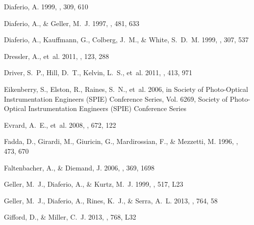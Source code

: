 \documentclass[iop]{emulateapj}
\begin{document}
\begin{thebibliography}{42}
{Diaferio}, A. 1999, \mnras, 309, 610

{Diaferio}, A., \& {Geller}, M.~J. 1997, \apj, 481, 633

{Diaferio}, A., {Kauffmann}, G., {Colberg}, J.~M., \& {White}, S.~D.~M. 1999,
  \mnras, 307, 537

{Dressler}, A., {et~al.} 2011, \pasp, 123, 288

{Driver}, S.~P., {Hill}, D.~T., {Kelvin}, L.~S., {et~al.} 2011, \mnras, 413,
  971

{Eikenberry}, S., {Elston}, R., {Raines}, S.~N., {et~al.} 2006, in Society of
  Photo-Optical Instrumentation Engineers (SPIE) Conference Series, Vol. 6269,
  Society of Photo-Optical Instrumentation Engineers (SPIE) Conference Series

{Evrard}, A.~E., {et~al.} 2008, \apj, 672, 122

{Fadda}, D., {Girardi}, M., {Giuricin}, G., {Mardirossian}, F., \& {Mezzetti},
  M. 1996, \apj, 473, 670

{Faltenbacher}, A., \& {Diemand}, J. 2006, \mnras, 369, 1698

{Geller}, M.~J., {Diaferio}, A., \& {Kurtz}, M.~J. 1999, \apjl, 517, L23

{Geller}, M.~J., {Diaferio}, A., {Rines}, K.~J., \& {Serra}, A.~L. 2013, \apj,
  764, 58

{Gifford}, D., \& {Miller}, C.~J. 2013, \apjl, 768, L32


\end{thebibliography}
\end{document}
